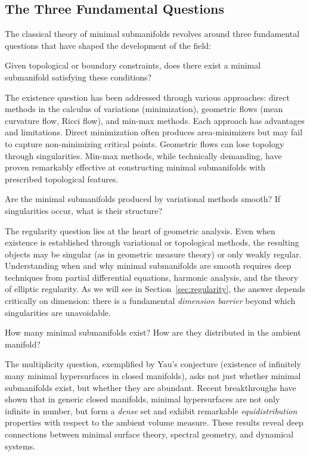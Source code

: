 \subsection{The Three Fundamental Questions}

The classical theory of minimal submanifolds revolves around three fundamental questions that have
shaped the development of the field:

\begin{question}[Existence]
Given topological or boundary constraints, does there exist a minimal submanifold satisfying these
conditions?
\end{question}

The existence question has been addressed through various approaches: direct methods in the
calculus of variations (minimization), geometric flows (mean curvature flow, Ricci flow), and
min-max methods. Each approach has advantages and limitations. Direct minimization often produces
area-minimizers but may fail to capture non-minimizing critical points. Geometric flows can lose
topology through singularities. Min-max methods, while technically demanding, have proven remarkably
effective at constructing minimal submanifolds with prescribed topological features.

\begin{question}[Regularity]
Are the minimal submanifolds produced by variational methods smooth? If singularities occur, what
is their structure?
\end{question}

The regularity question lies at the heart of geometric analysis. Even when existence is established
through variational or topological methods, the resulting objects may be singular (as in geometric
measure theory) or only weakly regular. Understanding when and why minimal submanifolds are smooth
requires deep techniques from partial differential equations, harmonic analysis, and the theory of
elliptic regularity. As we will see in Section~\ref{sec:regularity}, the answer depends critically
on dimension: there is a fundamental \emph{dimension barrier} beyond which singularities are
unavoidable.

\begin{question}
How many minimal submanifolds exist? How are they distributed in the ambient manifold?
\end{question}

The multiplicity question, exemplified by Yau's conjecture (existence of infinitely many minimal
hypersurfaces in closed manifolds), asks not just whether minimal submanifolds exist, but whether
they are abundant. Recent breakthroughs have shown that in generic closed manifolds, minimal
hypersurfaces are not only infinite in number, but form a \emph{dense} set and exhibit remarkable
\emph{equidistribution} properties with respect to the ambient volume measure. These results reveal
deep connections between minimal surface theory, spectral geometry, and dynamical systems.

